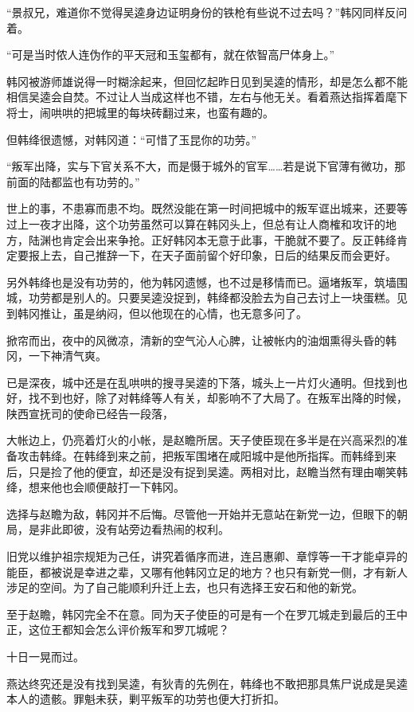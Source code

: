 “景叔兄，难道你不觉得吴逵身边证明身份的铁枪有些说不过去吗？”韩冈同样反问着。

“可是当时侬人连伪作的平天冠和玉玺都有，就在侬智高尸体身上。”

韩冈被游师雄说得一时糊涂起来，但回忆起昨日见到吴逵的情形，却是怎么都不能相信吴逵会自焚。不过让人当成这样也不错，左右与他无关。看着燕达指挥着麾下将士，闹哄哄的把城里的每块砖翻过来，也蛮有趣的。

但韩绛很遗憾，对韩冈道：“可惜了玉昆你的功劳。”

“叛军出降，实与下官关系不大，而是慑于城外的官军……若是说下官薄有微功，那前面的陆都监也有功劳的。”

世上的事，不患寡而患不均。既然没能在第一时间把城中的叛军诓出城来，还要等过上一夜才出降，这个功劳虽然可以算在韩冈头上，但总有让人商榷和攻讦的地方，陆渊也肯定会出来争抢。正好韩冈本无意于此事，干脆就不要了。反正韩绛肯定要报上去，自己推辞一下，在天子面前留个好印象，日后的结果反而会更好。

另外韩绛也是没有功劳的，他为韩冈遗憾，也不过是移情而已。逼堵叛军，筑墙围城，功劳都是别人的。只要吴逵没捉到，韩绛都没脸去为自己去讨上一块蛋糕。见到韩冈推让，虽是纳闷，但以他现在的心情，也无意多问了。

掀帘而出，夜中的风微凉，清新的空气沁人心脾，让被帐内的油烟熏得头昏的韩冈，一下神清气爽。

已是深夜，城中还是在乱哄哄的搜寻吴逵的下落，城头上一片灯火通明。但找到也好，找不到也好，除了对韩绛等人有关，却影响不了大局了。在叛军出降的时候，陕西宣抚司的使命已经告一段落，

大帐边上，仍亮着灯火的小帐，是赵瞻所居。天子使臣现在多半是在兴高采烈的准备攻击韩绛。在韩绛到来之前，把叛军围堵在咸阳城中是他所指挥。而韩绛到来后，只是捡了他的便宜，却还是没有捉到吴逵。两相对比，赵瞻当然有理由嘲笑韩绛，想来他也会顺便敲打一下韩冈。

选择与赵瞻为敌，韩冈并不后悔。尽管他一开始并无意站在新党一边，但眼下的朝局，是非此即彼，没有站旁边看热闹的权利。

旧党以维护祖宗规矩为己任，讲究着循序而进，连吕惠卿、章惇等一干才能卓异的能臣，都被说是幸进之辈，又哪有他韩冈立足的地方？也只有新党一侧，才有新人涉足的空间。为了自己能顺利升迁上去，也只有选择王安石和他的新党。

至于赵瞻，韩冈完全不在意。同为天子使臣的可是有一个在罗兀城走到最后的王中正，这位王都知会怎么评价叛军和罗兀城呢？

十日一晃而过。

燕达终究还是没有找到吴逵，有狄青的先例在，韩绛也不敢把那具焦尸说成是吴逵本人的遗骸。罪魁未获，剿平叛军的功劳也便大打折扣。

